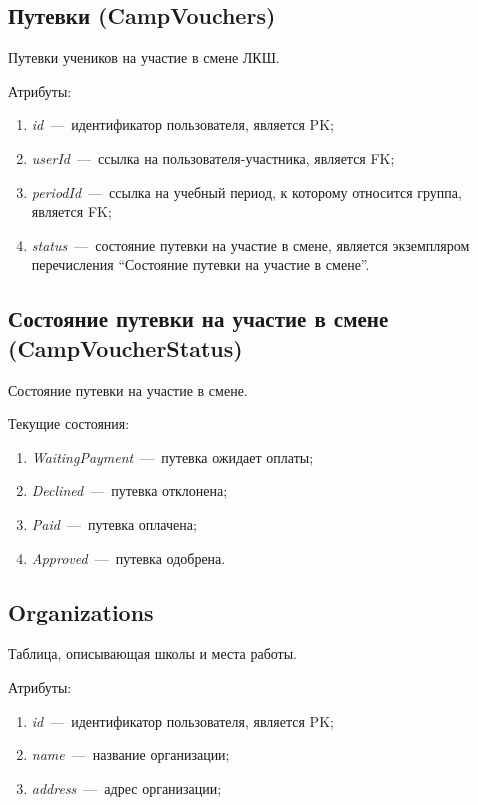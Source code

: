 \documentclass[14pt]{article}
\begin{document}
\subsection{Путевки (CampVouchers)}

Путевки учеников на участие в смене ЛКШ.

Атрибуты:
\begin{enumerate}
	\item \emph{id}~---~идентификатор пользователя, является PK; 
	\item \emph{userId}~---~ссылка на пользователя-участника, является FK;
	\item \emph{periodId}~---~ссылка на учебный период, к которому относится группа, является FK;
	\item \emph{status}~---~состояние путевки на участие в смене, является экземпляром перечисления ``Состояние путевки на участие в смене''. 
\end{enumerate}

\subsection{Состояние путевки на участие в смене (CampVoucherStatus)}

Состояние путевки на участие в смене.

Текущие состояния:

\begin{enumerate}
	\item \emph{WaitingPayment}~---~путевка ожидает оплаты;
	\item \emph{Declined}~---~путевка отклонена;
	\item \emph{Paid}~---~путевка оплачена;
	\item \emph{Approved}~---~путевка одобрена.
\end{enumerate}

\subsection{Organizations}

Таблица, описывающая школы и места работы.

Атрибуты:
\begin{enumerate}
	\item \emph{id}~---~идентификатор пользователя, является PK; 
	\item \emph{name}~---~название организации;
	\item \emph{address}~---~адрес организации;
\end{enumerate}
\end{document}
